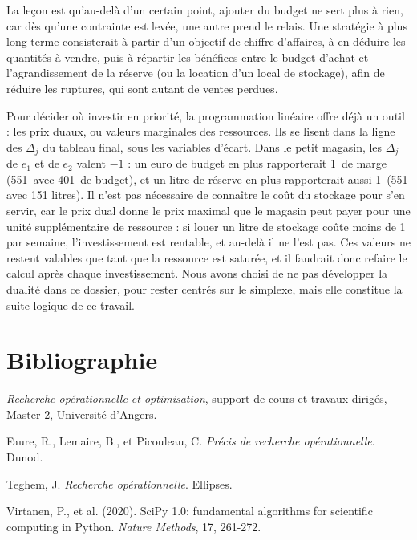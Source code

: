 \documentclass[11pt,a4paper]{article}
\newcommand{\eur}{\,\text{€}}
\begin{document}
La leçon est qu'au-delà d'un certain point, ajouter du budget ne sert plus à rien, car dès
qu'une contrainte est levée, une autre prend le relais. Une stratégie à plus long terme
consisterait à partir d'un objectif de chiffre d'affaires, à en déduire les quantités à vendre,
puis à répartir les bénéfices entre le budget d'achat et l'agrandissement de la réserve (ou la
location d'un local de stockage), afin de réduire les ruptures, qui sont autant de ventes
perdues.

Pour décider où investir en priorité, la programmation linéaire offre déjà un outil : les prix
duaux, ou valeurs marginales des ressources. Ils se lisent dans la ligne des $\Delta_j$ du
tableau final, sous les variables d'écart. Dans le petit magasin, les $\Delta_j$ de $e_1$ et de
$e_2$ valent $-1$ : un euro de budget en plus rapporterait 1\eur{} de marge (551\eur{} avec
401\eur{} de budget), et un litre de réserve en plus rapporterait aussi 1\eur{} (551\eur{} avec
151 litres). Il n'est pas nécessaire de connaître le coût du stockage pour s'en servir, car le
prix dual donne le prix maximal que le magasin peut payer pour une unité supplémentaire de
ressource : si louer un litre de stockage coûte moins de 1\eur{} par semaine, l'investissement
est rentable, et au-delà il ne l'est pas. Ces valeurs ne restent valables que tant que la
ressource est saturée, et il faudrait donc refaire le calcul après chaque investissement. Nous
avons choisi de ne pas développer la dualité dans ce dossier, pour rester centrés sur le
simplexe, mais elle constitue la suite logique de ce travail.

\section*{Bibliographie}
\begin{description}\setlength{\itemsep}{1pt}\small
\item \textit{Recherche opérationnelle et optimisation}, support de cours et travaux
  dirigés, Master 2, Université d'Angers.
\item Faure, R., Lemaire, B., et Picouleau, C. \textit{Précis de recherche opérationnelle}.
  Dunod.
\item Teghem, J. \textit{Recherche opérationnelle}. Ellipses.
\item Virtanen, P., et al. (2020). SciPy 1.0: fundamental algorithms for scientific
  computing in Python. \textit{Nature Methods}, 17, 261-272.
\end{description}
\end{document}
